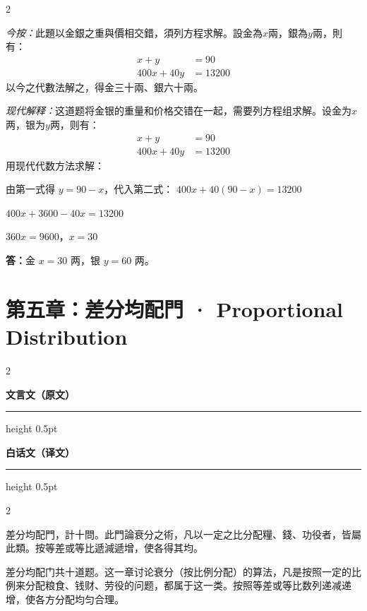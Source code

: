 \documentclass[11pt,a4paper]{article}
\newcommand{\classicalheader}{%
  \begin{center}
  \textbf{\textcolor{headerclassical}{\large 文言文（原文）}}
  \end{center}
  \vspace{-0.3em}
  \hrule height 0.5pt \color{classicalborder}
  \vspace{0.5em}
}
\newcommand{\modernheader}{%
  \begin{center}
  \textbf{\textcolor{headermodern}{\large 白话文（译文）}}
  \end{center}
  \vspace{-0.3em}
  \hrule height 0.5pt \color{modernborder}
  \vspace{0.5em}
}
\begin{document}
\begin{paracol}{2}
\begin{leftcolumn}
\textit{今按：}此題以金銀之重與價相交錯，須列方程求解。設金為$x$兩，銀為$y$兩，則有：
\begin{align*}
x + y &= 90 \\
400x + 40y &= 13200
\end{align*}
以今之代數法解之，得金三十兩、銀六十兩。
\end{leftcolumn}
\begin{rightcolumn}
\textit{现代解释：}这道题将金银的重量和价格交错在一起，需要列方程组求解。设金为$x$两，银为$y$两，则有：
\begin{align*}
x + y &= 90 \\
400x + 40y &= 13200
\end{align*}
用现代代数方法求解：

由第一式得 $y = 90 - x$，代入第二式：
$400x + 40(90-x) = 13200$

$400x + 3600 - 40x = 13200$

$360x = 9600$，$x = 30$

\textbf{答：}金 $x = 30$ 两，银 $y = 60$ 两。
\end{rightcolumn}
\end{paracol}

\newpage

\section{第五章：差分均配門 · Proportional Distribution}

\begin{paracol}{2}
\begin{leftcolumn}
\classicalheader
\end{leftcolumn}
\begin{rightcolumn}
\modernheader
\end{rightcolumn}
\end{paracol}

\begin{paracol}{2}
\begin{leftcolumn}
差分均配門，計十問。此門論衰分之術，凡以一定之比分配糧、錢、功役者，皆屬此類。按等差或等比遞減遞增，使各得其均。
\end{leftcolumn}
\begin{rightcolumn}
差分均配门共十道题。这一章讨论衰分（按比例分配）的算法，凡是按照一定的比例来分配粮食、钱财、劳役的问题，都属于这一类。按照等差或等比数列递减递增，使各方分配均匀合理。
\end{rightcolumn}
\end{paracol}
\end{document}
